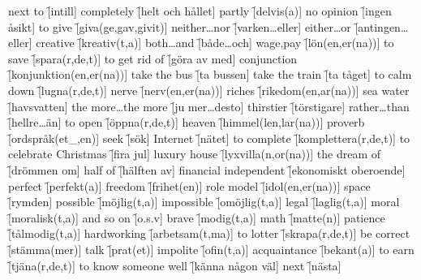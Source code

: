 \begin{questions}
    \begin{multicols}{2}
        \raggedcolumns
        \question next to \f[intill]
        \question completely \f[helt och hållet]
        \question partly \f[delvis(a)]
        \question no opinion \f[ingen åsikt]
        \question to give \f[giva(ge,gav,givit)]
        \question neither\ldots nor \f[varken\ldots eller]
        \question either\ldots or \f[antingen\ldots eller]
        \question creative \f[kreativ(t,a)]
        \question both\ldots and \f[både\ldots och]
        \question wage,pay \f[lön(en,er(na))]
        \question to save \f[spara(r,de,t)]
        \question to get rid of \f[göra av med]
        \question conjunction \f[konjunktion(en,er(na))]
        \question take the bus \f[ta bussen]
        \question take the train \f[ta tåget]
        \question to calm down \f[lugna(r,de,t)]
        \question nerve \f[nerv(en,er(na))]
        \question riches \f[rikedom(en,ar(na))]
        \question sea water \f[havsvatten]
        \question the more\ldots the more \f[ju mer\ldots desto]
        \question thirstier \f[törstigare]
        \question rather\ldots than \f[hellre\ldots än]
        \question to open \f[öppna(r,de,t)]
        \question heaven \f[himmel(len,lar(na))]
        \question proverb \f[ordspråk(et\_,en)]
        \question seek \f[sök]
        \question Internet \f[nätet]
        \question to complete \f[komplettera(r,de,t)]
        \question to celebrate Christmas \f[fira jul]
        \question luxury house \f[lyxvilla(n,or(na))]
        \question the dream of \f[drömmen om]
        \question half of \f[hälften av]
        \question financial independent \f[ekonomiskt oberoende] 
        \question perfect \f[perfekt(a)]
        \question freedom \f[frihet(en)]
        \question role model \f[idol(en,er(na))]
        \question space \f[rymden]
        \question possible \f[möjlig(t,a)]
        \question impossible \f[omöjlig(t,a)]
        \question legal \f[laglig(t,a)]
        \question moral \f[moralisk(t,a)]
        \question and so on \f[o.s.v]
        \question brave \f[modig(t,a)]
        \question math \f[matte(n)]
        \question patience \f[tålmodig(t,a)]
        \question hardworking \f[arbetsam(t,ma)]
        \question to lotter \f[skrapa(r,de,t)]
        \question be correct \f[stämma(mer)]
        \question talk \f[prat(et)]
        \question impolite \f[ofin(t,a)]
        \question acquaintance \f[bekant(a)]
        \question to earn \f[tjäna(r,de,t)]
        \question to know someone well \f[känna någon väl]
        \question next \f[nästa]

\end{multicols}
\end{questions}
